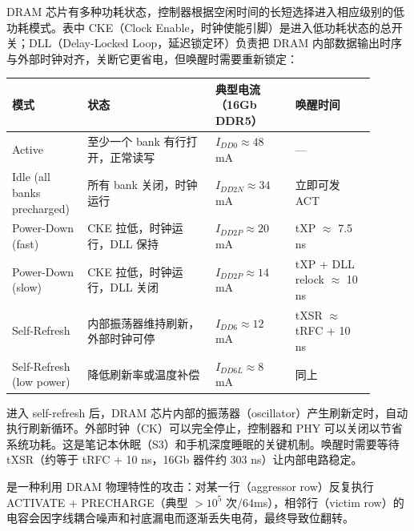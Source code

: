 DRAM 芯片有多种功耗状态，控制器根据空闲时间的长短选择进入相应级别的低功耗模式。表中 CKE（Clock Enable，时钟使能引脚）是进入低功耗状态的总开关；DLL（Delay-Locked Loop，延迟锁定环）负责把 DRAM 内部数据输出时序与外部时钟对齐，关断它更省电，但唤醒时需要重新锁定：

\begin{longtable}{L{0.18\linewidth}L{0.32\linewidth}L{0.2\linewidth}L{0.2\linewidth}}
\toprule
模式 & 状态 & 典型电流（16Gb DDR5） & 唤醒时间 \\
\midrule
Active & 至少一个 bank 有行打开，正常读写 & $I_{DD0} \approx 48$ mA & --- \\\tablerowrule
Idle (all banks precharged) & 所有 bank 关闭，时钟运行 & $I_{DD2N} \approx 34$ mA & 立即可发 ACT \\\tablerowrule
Power-Down (fast) & CKE 拉低，时钟运行，DLL 保持 & $I_{DD2P} \approx 20$ mA & tXP $\approx$ 7.5 ns \\\tablerowrule
Power-Down (slow) & CKE 拉低，时钟运行，DLL 关闭 & $I_{DD2P} \approx 14$ mA & tXP + DLL relock $\approx$ 10 ns \\\tablerowrule
Self-Refresh & 内部振荡器维持刷新，外部时钟可停 & $I_{DD6} \approx 12$ mA & tXSR $\approx$ tRFC + 10 ns \\\tablerowrule
Self-Refresh (low power) & 降低刷新率或温度补偿 & $I_{DD6L} \approx 8$ mA & 同上 \\
\bottomrule
\end{longtable}



进入 self-refresh 后，DRAM 芯片内部的振荡器（oscillator）产生刷新定时，自动执行刷新循环。外部时钟（CK）可以完全停止，控制器和 PHY 可以关闭以节省系统功耗。这是笔记本休眠（S3）和手机深度睡眠的关键机制。唤醒时需要等待 tXSR（约等于 tRFC + 10 ns，16Gb 器件约 303 ns）让内部电路稳定。


 是一种利用 DRAM 物理特性的攻击：对某一行（aggressor row）反复执行 ACTIVATE + PRECHARGE（典型 $>10^5$ 次/64ms），相邻行（victim row）的电容会因字线耦合噪声和衬底漏电而逐渐丢失电荷，最终导致位翻转。

